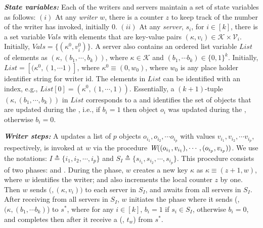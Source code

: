 \textit{\textbf{State variables:}} Each of the writers and servers maintain a set of state variables as follows: $(i)$ At  any  \emph{writer $w$}, there is  a counter $z$ to keep track of the
 number of \wot{}  the writer has  invoked, initially $0$. $(ii)$ At any  \emph{server}, $s_i$, 
 for $i \in [k]$, there is  a set variable $Vals$ 
 with elements 
 that are  key-value pairs $({\kappa}, v_i) \in \mathcal{K} \times \mathcal{V}_i$. Initially,
  $Vals= \{ ({\kappa}^0, v_i^0)\}$. %
A server also contains an
 ordered list variable $List$  of elements  as $({\kappa}, (b_1, \cdots, b_k))$,  where 
 ${\kappa}  \in \mathcal{K}$  and 
 $(b_1, \cdots b_k) \in  \{0, 1\}^k$. Initially,  
 $List= [ ({\kappa}^0, (1, \cdots 1) ]$, where ${\kappa}^0  \equiv (0, w_0)$, 
 where $w_0$ is any
  place holder identifier string for writer id. The elements in $List$ can be identified with an index, e.g., 
  $List[0] =({\kappa}^0, (1, \cdots, 1))$.  Essentially, a $(k+1)$-tuple  $(\kappa, (b_1, \cdots, b_k))$ in $List$ corresponds to a \wot{} and 
   identifies the set of objects that are updated during the \wot{}, i.e., if $b_i=1$ then object 
   $o_i$ was updated  during  the  \wot{}, otherwise $b_i=0$.
					
\textit{\textbf{Writer steps:}} A \wot{} updates
			a  list of $p$ objects $o_{i_1}, o_{i_2}, \cdots o_{i_p}$  with values
			 $v_{i_1}, v_{i_2}, \cdots v_{i_p}$, respectively, is invoked at $w$ via the procedure
			${\textit{W}( (o_{i_1}, v_{i_1}), \cdots, (o_{i_p}, v_{i_p}) )}$.
We use the notations:  $I \triangleq \{i_1, i_2, \cdots, i_p\}$  and $S_I\triangleq \{s_{i_1}, s_{i_2}, \cdots, s_{i_p}\}$.
This procedure  consists of two phases: {\writeValue} and {\updateCoord}. 
During the {\writeValue} phase,  $w$ creates a new key ${\kappa}$ as 
 $ {\kappa}  \equiv (z + 1, w)$, where $w$ identifies the writer; and also increments the local counter $z$ by one.  Then $w$ sends $(${\writeValueTag}$, ({\kappa}, v_{i}))$ to each server in $S_I$, and awaits {\ackTag}  
from all servers in $S_I$.
After receiving {\ackTag} from all servers in $S_I$,  $w$
initiates the {\updateCoord} phase where it sends 
(\updateCoordTag, $({\kappa}, (b_{1}, \cdots b_{k})$) to $s^*$, where for any $i \in [k]$,  $b_i=1$ if $s_i \in S_I$, 
otherwise $b_i=0$,   and completes then \wot{} after it receive a   ({\ackTag}, $t_w$) from $s^*$.  

